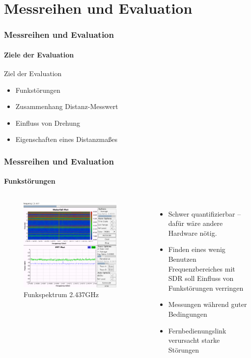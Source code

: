 \documentclass{beamer}
\begin{document}
\section{Messreihen und Evaluation}
\begin{frame}
	\frametitle{Messreihen und Evaluation}
	\framesubtitle{Ziele der Evaluation}
	Ziel der Evaluation
	\begin{itemize}
		\item Funkstörungen
		\item Zusammenhang Distanz-Messwert
		\item Einfluss von Drehung
		\item Eigenschaften eines Distanzmaßes
	\end{itemize}

\end{frame}

\begin{frame}
	\frametitle{Messreihen und Evaluation}
	\framesubtitle{Funkstörungen}

	\begin{columns}

		\begin{figure}
			\centering
			\includegraphics[width=0.9\textwidth]{img/ch6.png}
			\caption{Funkspektrum 2.437GHz}
		\end{figure}
		\begin{itemize}
			\item Schwer quantifizierbar – dafür wäre andere Hardware nötig.
			\item Finden eines wenig Benutzen Frequenzbereiches mit SDR soll Einfluss von Funkstörungen verringen
			\item Messungen während guter Bedingungen
			\item Fernbedienungslink verursacht starke Störungen
		\end{itemize}

	\end{columns}	


\end{frame}
\end{document}
